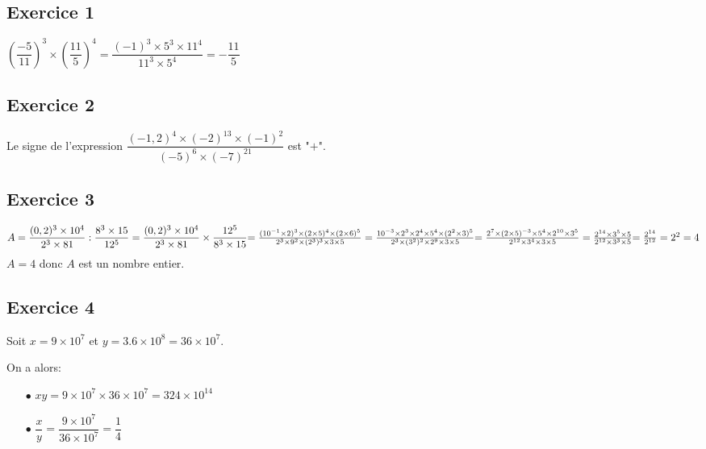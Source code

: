 \documentclass[12pt, twoside]{article}
\begin{document}
\section*{}

\bigskip
\bigskip
\subsection*{Exercice 1}
$(\dfrac{-5}{11})^{3}\times(\dfrac{11}{5})^{4}=\dfrac{(-1)^3\times5^3\times11^4}{11^3\times5^4}=-\dfrac{11}{5}$

\subsection*{Exercice 2}
Le signe de l'expression
$\dfrac{(-1,2)^{4}\times(-2)^{13}\times(-1)^{2}}{(-5)^{6}\times(-7)^{21}}$ est "$+$".

\subsection*{Exercice 3}

\begin{equation}
A=\frac{(0,2)^{3}\times10^{4}}{2^{3}\times81}: \frac{8^{3}\times15}{12^{5}} =
\frac{(0,2)^{3}\times10^{4}}{2^{3}\times81}\times \frac{12^{5}}{8^{3}\times15}
$$\bigskip$$
=\frac{(10^{-1}\times2)^3\times(2\times5)^4\times(2\times6)^5}{2^3\times9^2\times(2^3)^3\times3\times5}
=\frac{10^{-3}\times2^3\times2^4\times5^4\times(2^2\times3)^5}{2^3\times(3^2)^2\times2^9\times3\times5}
$$\bigskip$$
=\frac{2^7\times(2\times5)^{-3}\times5^4\times2^{10}\times3^5}{2^{12}\times3^4\times3\times5}=\frac{2^{14}\times3^5\times5}{2^{12}\times3^3\times5}
$$\bigskip$$
=\frac{2^{14}}{2^{12}}=2^2=4$$\notag$$
\end{equation}
 $A=4$ donc $A$ est un nombre entier.
\subsection*{Exercice 4}
Soit $x=9\times10^7$ et $y=3.6\times10^8=36\times10^7$.

On a alors:
\bigskip
\begin{itemize}
  \item[$\bullet$] $xy=9\times10^7\times36\times10^7=324\times10^{14}$
  \medskip
  \item[$\bullet$] $\dfrac{x}{y}=\dfrac{9\times10^7}{36\times10^7}=\dfrac{1}{4}$
\end{itemize}
\end{document}
